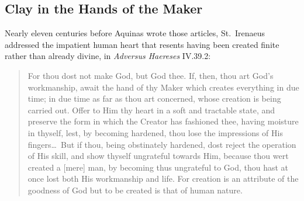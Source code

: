 \subsection{Clay in the Hands of the Maker}

Nearly eleven centuries before Aquinas wrote those articles, St.\ Irenaeus addressed the impatient human heart that resents having been created finite rather than already divine, in \emph{Adversus Haereses} IV.39.2:

\begin{quote}
For thou dost not make God, but God thee. If, then, thou art God's workmanship, await the hand of thy Maker which creates everything in due time; in due time as far as thou art concerned, whose creation is being carried out. Offer to Him thy heart in a soft and tractable state, and preserve the form in which the Creator has fashioned thee, having moisture in thyself, lest, by becoming hardened, thou lose the impressions of His fingers\dots\ But if thou, being obstinately hardened, dost reject the operation of His skill, and show thyself ungrateful towards Him, because thou wert created a [mere] man, by becoming thus ungrateful to God, thou hast at once lost both His workmanship and life. For creation is an attribute of the goodness of God but to be created is that of human nature.
\end{quote}
